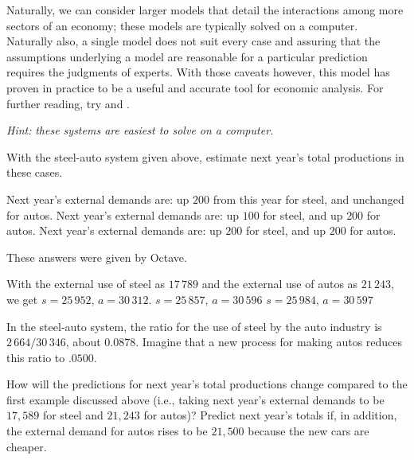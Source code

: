 Naturally, we can consider larger models that detail the interactions 
among more sectors of an economy;
these models are typically solved on a computer.
Naturally also, a single model does not suit every case and 
assuring that the assumptions underlying a model
are reasonable for a particular prediction requires the judgments of experts.
With those caveats
however, this model has proven in practice to be a useful and accurate tool for
economic analysis.
For further reading, try \cite{Leontief1951} and \cite{Leontief1965}. 


\begin{exercises}
  \item[\textit{Hint:}]  
    \textit{these systems are easiest to solve on a computer.}
  \item 
    With the steel-auto system given above, estimate next year's
    total productions in these cases.
    \begin{exparts}
      \partsitem Next year's external demands are: up $200$ from this
         year for steel, and unchanged for autos.
      \partsitem Next year's external demands are: up $100$ for steel, and
         up $200$ for autos.
      \partsitem Next year's external demands are: up $200$ for steel, and
         up $200$ for autos.
    \end{exparts} 
    \begin{answer}
      These answers were given by Octave.
      \begin{exparts}
        \partsitem With the external use of steel as $17\,789$ and the 
          external use of autos as $21\,243$, we get $s=25\,952$, $a=30\,312$.
        \partsitem $s=25\,857$, $a=30\,596$
        \partsitem $s=25\,984$, $a=30\,597$
      \end{exparts}
    \end{answer}
  \item 
    In the steel-auto system, the ratio for the use of steel by the auto
    industry is $2\,664/30\,346$, about $0.0878$.
    Imagine that a new process for making autos reduces this 
    ratio to $.0500$.
    \begin{exparts}
      \partsitem How will the predictions for next year's total
        productions change compared to the first example discussed
        above (i.e., taking next year's external demands to be
        $17,589$ for steel and $21,243$ for autos)?
      \partsitem Predict next year's totals if, in addition,
        the external demand for
        autos rises to be $21,500$ because the new cars are cheaper.

\end{exparts}
\end{exercises}
